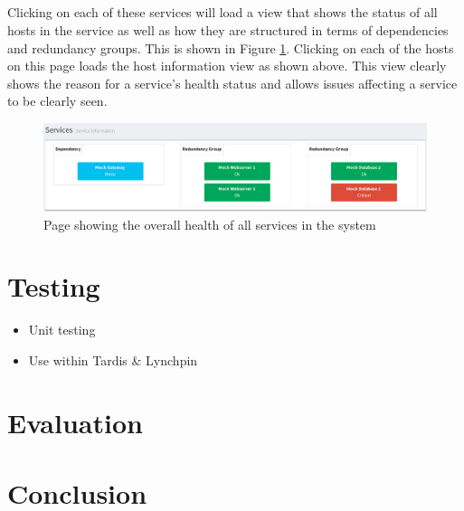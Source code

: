 \documentclass[bsc,logo,twoside]{infthesis}
\begin{document}
\paragraph*{}
	Clicking on each of these services will load a view that shows the status of
	all hosts in the service as well as how they are structured in terms of
	dependencies and redundancy groups.  This is shown in Figure
	\ref{service-information}.  Clicking on each of the hosts on this page loads
	the host information view as shown above.  This view clearly shows the reason
	for a service's health status and allows issues affecting a service to be
	clearly seen.

\begin{figure}[H]
	\centering
	\caption{Page showing the overall health of all services in the system}
	\label{service-information}
	\includegraphics[scale=0.44]{assets/screenshots/service-information.pdf}
\end{figure}


\chapter{Testing}
\begin{itemize}
	\item Unit testing
	\item Use within Tardis \& Lynchpin
\end{itemize}

\chapter{Evaluation}

\chapter{Conclusion}
\end{document}
